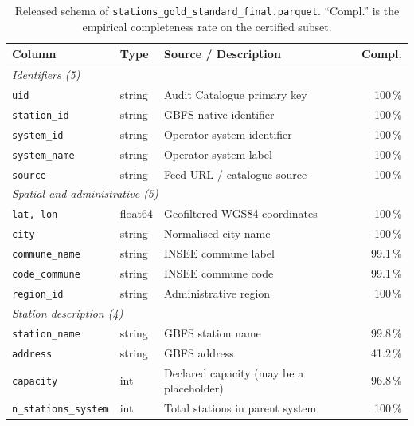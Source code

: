 \documentclass[11pt,a4paper]{article}
\begin{document}
\begin{table}[ht]
\centering
\caption{Released schema of \texttt{stations\_gold\_standard\_final.parquet}.
``Compl.'' is the empirical completeness rate on the certified subset.}
\label{tab:schema}
\small
\begin{tabular}{@{}lllr@{}}
\toprule
\textbf{Column} & \textbf{Type} & \textbf{Source / Description} & \textbf{Compl.}\\
\midrule
\multicolumn{4}{l}{\textit{Identifiers (5)}}\\
\quad\texttt{uid}                & string  & Audit Catalogue primary key                 & 100\,\%\\
\quad\texttt{station\_id}         & string  & GBFS native identifier                    & 100\,\%\\
\quad\texttt{system\_id}          & string  & Operator-system identifier                & 100\,\%\\
\quad\texttt{system\_name}        & string  & Operator-system label                     & 100\,\%\\
\quad\texttt{source}              & string  & Feed URL / catalogue source               & 100\,\%\\
\midrule
\multicolumn{4}{l}{\textit{Spatial and administrative (5)}}\\
\quad\texttt{lat, lon}             & float64 & Geofiltered WGS84 coordinates             & 100\,\%\\
\quad\texttt{city}                 & string  & Normalised city name                      & 100\,\%\\
\quad\texttt{commune\_name}        & string  & INSEE commune label                       & 99.1\,\%\\
\quad\texttt{code\_commune}        & string  & INSEE commune code                        & 99.1\,\%\\
\quad\texttt{region\_id}           & string  & Administrative region                     & 100\,\%\\
\midrule
\multicolumn{4}{l}{\textit{Station description (4)}}\\
\quad\texttt{station\_name}        & string  & GBFS station name                         & 99.8\,\%\\
\quad\texttt{address}              & string  & GBFS address                              & 41.2\,\%\\
\quad\texttt{capacity}             & int     & Declared capacity (may be a placeholder)   & 96.8\,\%\\
\quad\texttt{n\_stations\_system}  & int     & Total stations in parent system            & 100\,\%\\

\end{tabular}
\end{table}
\end{document}
